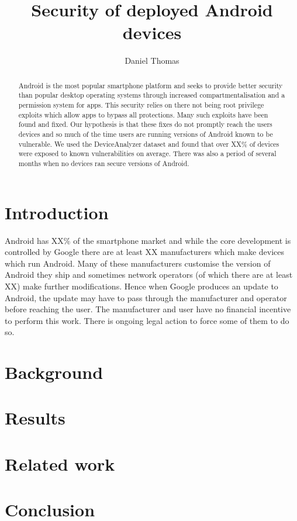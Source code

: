 \documentclass[conference,a4paper,twoside]{IEEEtran}
\author{Daniel Thomas}
\begin{document}
\title{Security of deployed Android devices}


\author{
}


\maketitle


\begin{abstract}
Android is the most popular smartphone platform and seeks to provide better security than popular desktop operating systems through increased compartmentalisation and a permission system for apps.
This security relies on there not being root privilege exploits which allow apps to bypass all protections.
Many such exploits have been found and fixed.
Our hypothesis is that these fixes do not promptly reach the users devices and so much of the time users are running versions of Android known to be vulnerable.
We used the DeviceAnalyzer dataset\cite{TODO} and found that over XX\% of devices were exposed to known vulnerabilities on average. %
There was also a period of several months when no devices ran secure versions of Android.
\end{abstract}

\section{Introduction}
Android has XX\% of the smartphone market\cite{TODO} and while the core development is controlled by Google there are at least XX\cite{TODO} manufacturers which make devices which run Android.
Many of these manufacturers customise the version of Android they ship and sometimes network operators (of which there are at least XX\cite{TODO}) make further modifications.
Hence when Google produces an update to Android, the update may have to pass through the manufacturer and operator before reaching the user.
The manufacturer and user have no financial incentive to perform this work.
There is ongoing legal action to force some of them to do so\cite{TODO}.



\section{Background}

\section{Results}

\section{Related work}

\section{Conclusion}
\end{document}
